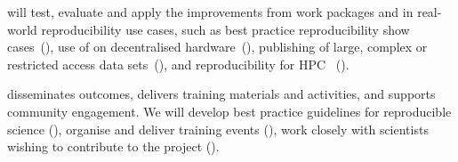      will test, evaluate and apply the improvements from
    work packages  and  in real-world
    reproducibility use cases, such as best practice reproducibility show
    cases~(), use of \repotodocker{} on
    decentralised hardware~(), publishing
    of large, complex or restricted access data
    sets~(), and reproducibility for HPC~
    ().

     disseminates outcomes, delivers training materials
    and activities, and supports community engagement. We will develop best practice guidelines for reproducible
    science (), organise and deliver
    training events (), work closely with
    scientists wishing to contribute to the project ().

% 
% 
% 
% 
% 
% 

